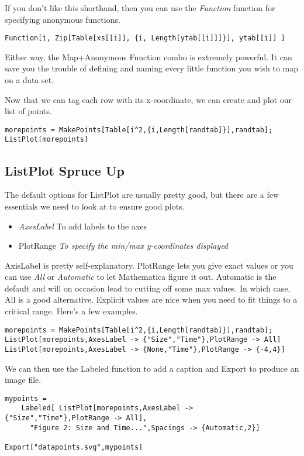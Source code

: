 \documentclass[]{tufte-handout}
\begin{document}
If you don't like this shorthand, then you can use the \textit{Function} function for specifying anonymous functions.
\begin{verbatim}
Function[i, Zip[Table[xs[[i]], {i, Length[ytab[[i]]]}], ytab[[i]] ]
\end{verbatim}
Either way, the Map+Anonymous Function combo is extremely powerful. It can save you the trouble of defining and naming every little function you wish to map on a data set. 

Now that we can tag each row with its x-coordinate, we can create and plot our list of points.
\begin{verbatim}
morepoints = MakePoints[Table[i^2,{i,Length[randtab]}],randtab];
ListPlot[morepoints]
\end{verbatim}

\subsection{ListPlot Spruce Up}

The default options for ListPlot are usually pretty good, but there are a few essentials we need to look at to ensure good plots. 
\begin{itemize}
\item \textit{AxesLabel} To add labels to the axes
\item PlotRange \textit{To specify the min/max y-coordinates displayed}
\end{itemize}

AxisLabel is pretty self-explanatory. PlotRange lets you give exact values or you can use \textit{All} or \textit{Automatic} to let Mathematica figure it out.  Automatic is the default and will on occasion lead to cutting off some max values. In which case, All is a good alternative.  Explicit values are nice when you need to fit things to a critical range. Here's a few examples.
\begin{verbatim}
morepoints = MakePoints[Table[i^2,{i,Length[randtab]}],randtab];
ListPlot[morepoints,AxesLabel -> {"Size","Time"},PlotRange -> All]
ListPlot[morepoints,AxesLabel -> {None,"Time"},PlotRange -> {-4,4}]
\end{verbatim}

We can then use the Labeled function to add a caption and Export to produce an image file. 
\begin{verbatim}
mypoints = 
	Labeled[ ListPlot[morepoints,AxesLabel -> {"Size","Time"},PlotRange -> All],
	  "Figure 2: Size and Time...",Spacings -> {Automatic,2}]

Export["datapoints.svg",mypoints]
\end{verbatim}
\end{document}
